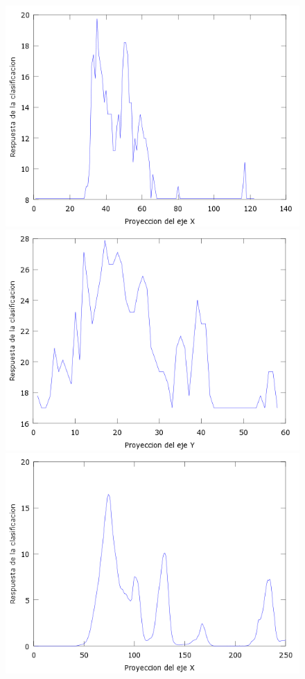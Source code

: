 \begin{figure}[htc]
  \centering
  \includegraphics[scale=.4]{images/plots/boost5X}
  \includegraphics[scale=.4]{images/plots/boost5Y}
  \includegraphics[scale=.4]{images/plots/svm5X}

\end{figure}
